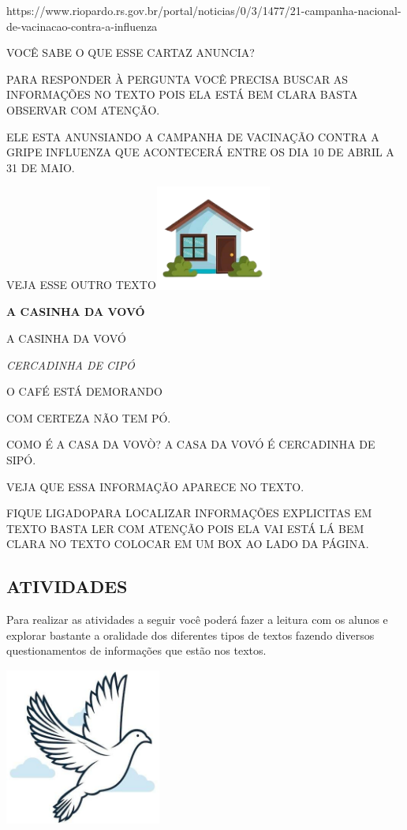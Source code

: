 https://www.riopardo.rs.gov.br/portal/noticias/0/3/1477/21-campanha-nacional-de-vacinacao-contra-a-influenza

VOCÊ SABE O QUE ESSE CARTAZ ANUNCIA?

PARA RESPONDER À PERGUNTA VOCÊ PRECISA BUSCAR AS INFORMAÇÕES NO TEXTO
POIS ELA ESTÁ BEM CLARA BASTA OBSERVAR COM ATENÇÃO.

ELE ESTA ANUNSIANDO A CAMPANHA DE VACINAÇÃO CONTRA A GRIPE INFLUENZA QUE
ACONTECERÁ ENTRE OS DIA 10 DE ABRIL A 31 DE MAIO.

VEJA ESSE OUTRO
TEXTO\includegraphics[width=1.50833in,height=1.35903in]{media/image125.jpg}

\textbf{A CASINHA DA VOVÓ}

A CASINHA DA VOVÓ

\emph{CERCADINHA DE CIPÓ}

O CAFÉ ESTÁ DEMORANDO

COM CERTEZA NÃO TEM PÓ.

COMO É A CASA DA VOVÒ? A CASA DA VOVÓ É CERCADINHA DE SIPÓ.

VEJA QUE ESSA INFORMAÇÃO APARECE NO TEXTO.

FIQUE LIGADOPARA LOCALIZAR INFORMAÇÕES EXPLICITAS EM TEXTO BASTA LER COM
ATENÇÃO POIS ELA VAI ESTÁ LÁ BEM CLARA NO TEXTO COLOCAR EM UM BOX AO
LADO DA PÁGINA.

\subsection{ATIVIDADES}\label{atividades-2}

Para realizar as atividades a seguir você poderá fazer a leitura com os
alunos e explorar bastante a oralidade dos diferentes tipos de textos
fazendo diversos questionamentos de informações que estão nos textos.

\includegraphics[width=2.02153in,height=2.05208in]{media/image126.jpg}

